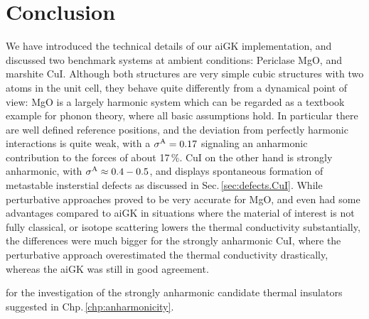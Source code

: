 \section{Conclusion}
We have introduced the technical details of our aiGK implementation, and discussed two benchmark systems at ambient conditions: Periclase MgO, and marshite CuI. Although both structures are very simple cubic structures with two atoms in the unit cell, they behave quite differently from a dynamical point of view: MgO is a largely harmonic system which can be regarded as a textbook example for phonon theory, where all basic assumptions hold. In particular there are well defined reference positions, and the deviation from perfectly harmonic interactions is quite weak, with a $\sigma^\mathrm{A} = 0.17$ signaling an anharmonic contribution to the forces of about 17\,\%. CuI on the other hand is strongly anharmonic, with $\sigma^\mathrm{A} \approx 0.4-0.5$, and displays spontaneous formation of metastable insterstial defects as discussed in Sec.\,\ref{sec:defects.CuI}. 
While perturbative approaches proved to be very accurate for MgO, and even had some advantages compared to aiGK in situations where the material of interest is not fully classical, or isotope scattering lowers the thermal conductivity substantially, the differences were much bigger for the strongly anharmonic CuI, where the perturbative approach overestimated the thermal conductivity drastically, whereas the aiGK was still in good agreement.

 for the investigation of the strongly anharmonic candidate thermal insulators suggested in Chp.\,\ref{chp:anharmonicity}.